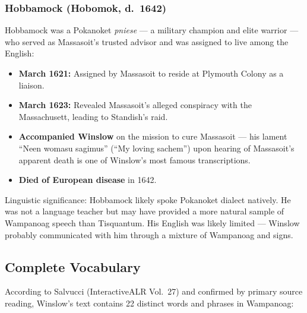 \subsubsection{Hobbamock (Hobomok, d.~1642)}

Hobbamock was a Pokanoket \emph{pniese} --- a military champion and elite
warrior --- who served as Massasoit's trusted advisor and was assigned to live
among the English:

\begin{itemize}
  \item \textbf{March 1621:} Assigned by Massasoit to reside at Plymouth Colony
    as a liaison.
  \item \textbf{March 1623:} Revealed Massasoit's alleged conspiracy with the
    Massachusett, leading to Standish's raid.
  \item \textbf{Accompanied Winslow} on the mission to cure Massasoit --- his
    lament ``Neen womasu sagimus'' (``My loving sachem'') upon hearing of
    Massasoit's apparent death is one of Winslow's most famous transcriptions.
  \item \textbf{Died of European disease} in 1642.
\end{itemize}

Linguistic significance: Hobbamock likely spoke Pokanoket dialect natively.
He was not a language teacher but may have provided a more natural sample of
Wampanoag speech than Tisquantum. His English was likely limited --- Winslow
probably communicated with him through a mixture of Wampanoag and signs.

\subsection{Complete Vocabulary}

According to Salvucci (InteractiveALR Vol.\ 27) and confirmed by primary source
reading, Winslow's text contains 22 distinct words and phrases in Wampanoag:

